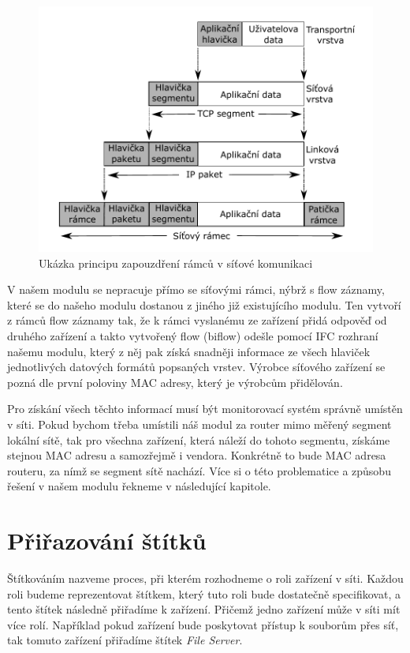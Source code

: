 \documentclass[thesis=B,czech,hidelinks]{FITthesis}[2019/03/21]
\begin{document}
    
    \begin{figure}[h]
        \centering
        \includegraphics[width=\textwidth]{zapouzdreni.pdf}
        \caption[Zapouzdření]{Ukázka principu zapouzdření rámců v síťové komunikaci}
        \label{Encapsulation}
    \end{figure}
    
    V našem modulu se nepracuje přímo se síťovými rámci, nýbrž s flow záznamy, které se do našeho modulu dostanou z jiného již existujícího modulu. Ten vytvoří z rámců flow záznamy tak, že k rámci vyslanému ze zařízení přidá odpověď od druhého zařízení a takto vytvořený flow (biflow) odešle pomocí IFC rozhraní našemu modulu, který z něj pak získá snadněji informace ze všech hlaviček jednotlivých datových formátů popsaných vrstev. Výrobce síťového zařízení se pozná dle první poloviny MAC adresy, který je výrobcům přidělován.
    
    Pro získání všech těchto informací musí být monitorovací systém správně umístěn v síti. Pokud bychom třeba umístili náš modul za router mimo měřený segment lokální sítě, tak pro všechna zařízení, která náleží do tohoto segmentu, získáme stejnou MAC adresu a samozřejmě i vendora. Konkrétně to bude MAC adresa routeru, za nímž se segment sítě nachází. Více si o této problematice a způsobu řešení v našem modulu řekneme v následující kapitole.
    \section{Přiřazování štítků}
    Štítkováním nazveme proces, při kterém rozhodneme o roli zařízení v síti. Každou roli budeme reprezentovat štítkem, který tuto roli bude dostatečně specifikovat, a tento štítek následně přiřadíme k zařízení. Přičemž jedno zařízení může v síti mít více rolí. Například pokud zařízení bude poskytovat přístup k souborům přes síť, tak tomuto zařízení přiřadíme štítek \emph{File Server}.
    
\end{document}
